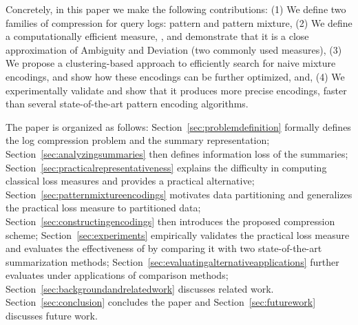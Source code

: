 Concretely, in this paper we make the following contributions:
(1) We define two families of compression for query logs: pattern and pattern mixture, 
(2) We define a computationally efficient measure, \errorname, and demonstrate that it is a close approximation of Ambiguity and Deviation (two commonly used measures),
(3) We propose a clustering-based approach to efficiently search for naive mixture encodings, and show how these encodings can be further optimized, and, 
(4) We experimentally validate \systemname and show that it produces more precise encodings, faster than several state-of-the-art pattern encoding algorithms.

The paper is organized as follows: Section~\ref{sec:problemdefinition} formally defines the log compression problem and the summary representation;
Section~\ref{sec:analyzingsummaries} then defines information loss of the summaries;
Section~\ref{sec:practicalrepresentativeness} explains the difficulty in computing classical loss measures and provides a practical alternative;
Section~\ref{sec:patternmixtureencodings} motivates data partitioning and generalizes the practical loss measure to partitioned data;
Section~\ref{sec:constructingencodings} then introduces the proposed \systemname compression scheme;
Section~\ref{sec:experiments} empirically validates the practical loss measure and evaluates the effectiveness of \systemname by comparing it with two state-of-the-art summarization methods;
Section~\ref{sec:evaluatingalternativeapplications} further evaluates \systemname under applications of comparison methods;
Section~\ref{sec:backgroundandrelatedwork} discusses related work.
Section~\ref{sec:conclusion} concludes the paper and Section~\ref{sec:futurework} discusses future work.
